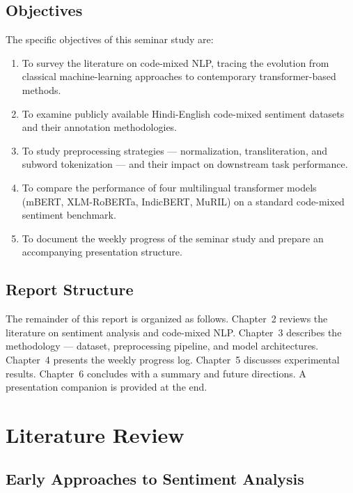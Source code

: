\documentclass[12pt,a4paper]{report}
\begin{document}
\section{Objectives}

The specific objectives of this seminar study are:

\begin{enumerate}[nosep,itemsep=3pt]
  \item To survey the literature on code-mixed NLP, tracing the evolution from classical machine-learning approaches to contemporary transformer-based methods.
  \item To examine publicly available Hindi-English code-mixed sentiment datasets and their annotation methodologies.
  \item To study preprocessing strategies — normalization, transliteration, and subword tokenization — and their impact on downstream task performance.
  \item To compare the performance of four multilingual transformer models (mBERT, XLM-RoBERTa, IndicBERT, MuRIL) on a standard code-mixed sentiment benchmark.
  \item To document the weekly progress of the seminar study and prepare an accompanying presentation structure.
\end{enumerate}

\section{Report Structure}

The remainder of this report is organized as follows. Chapter~2 reviews the literature on sentiment analysis and code-mixed NLP. Chapter~3 describes the methodology — dataset, preprocessing pipeline, and model architectures. Chapter~4 presents the weekly progress log. Chapter~5 discusses experimental results. Chapter~6 concludes with a summary and future directions. A presentation companion is provided at the end.

\chapter{Literature Review}

\section{Early Approaches to Sentiment Analysis}
\end{document}
